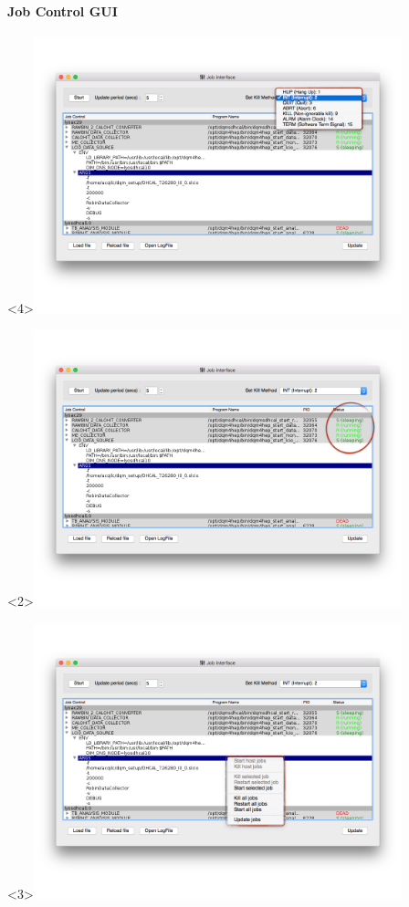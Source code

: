 \documentclass[8pt]{beamer}
\begin{document}
       
  \begin{frame}
    \frametitle{\secname}
    \framesubtitle{ Job Control GUI }
      \begin{overlayarea}{\textwidth}{\textheight}
      \begin{center}
        \begin{onlyenv}<4>\includegraphics[width=0.8\textwidth]{figs/JobInterface/JobInterface_KillSwitch.png}\end{onlyenv}
        \begin{onlyenv}<2>\includegraphics[width=0.8\textwidth]{figs/JobInterface/JobInterface_LiveStatus.png}\end{onlyenv}
        \begin{onlyenv}<3>\includegraphics[width=0.8\textwidth]{figs/JobInterface/JobInterface_Module.png}\end{onlyenv}

\end{center}
\end{overlayarea}
\end{frame}
\end{document}
